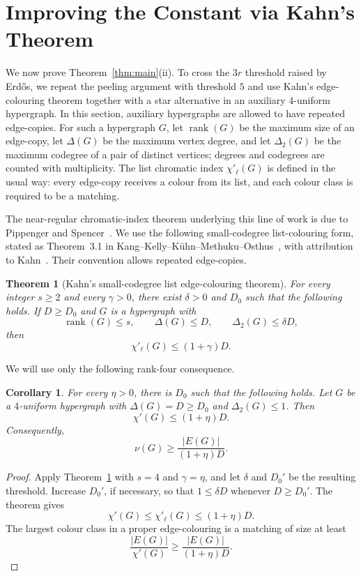 \documentclass[11pt]{amsart}
\newtheorem{theorem}{Theorem}
\newtheorem{corollary}{Corollary}
\theoremstyle{remark}
\newcommand{\rank}{\operatorname{rank}}
\newcommand{\gam}{\gamma}
\newcommand{\Del}{\Delta}
\newcommand{\DelTwo}{\Delta_2}
\begin{document}
\section{Improving the Constant via Kahn's Theorem}

We now prove Theorem~\ref{thm:main}(ii).  To cross the $3r$ threshold raised
by Erd\H{o}s, we repeat the peeling argument with threshold $5$ and use
Kahn's edge-colouring theorem together with a star alternative in an auxiliary
$4$-uniform hypergraph.  In this section, auxiliary
hypergraphs are allowed to have repeated edge-copies.  For such a hypergraph
$G$, let $\rank(G)$ be the maximum size of an edge-copy, let $\Del(G)$ be the
maximum vertex degree, and let $\DelTwo(G)$ be the maximum codegree of a pair
of distinct vertices; degrees and codegrees are counted with multiplicity.  The
list chromatic index $\chi'_\ell(G)$ is defined in the usual way: every
edge-copy receives a colour from its list, and each colour class is required
to be a matching.

The near-regular chromatic-index theorem underlying this line of work is due
to Pippenger and Spencer~\cite{PippengerSpencer}.  We use the following
small-codegree list-colouring form, stated as Theorem~3.1 in
Kang--Kelly--K\"uhn--Methuku--Osthus~\cite{KKMO}, with attribution to
Kahn~\cite{KahnList}.  Their convention allows repeated edge-copies.

\begin{theorem}[Kahn's small-codegree list edge-colouring theorem]
\label{thm:kahn}
For every integer $s\ge 2$ and every $\gam>0$, there exist $\delta>0$ and
$D_0$ such that the following holds.  If $D\ge D_0$ and $G$ is a hypergraph
with
\[
  \rank(G)\le s,\qquad \Del(G)\le D,\qquad \DelTwo(G)\le \delta D,
\]
then
\[
  \chi'_\ell(G)\le (1+\gam)D.
\]
\end{theorem}

We will use only the following rank-four consequence.

\begin{corollary}\label{cor:kahn-rank-four}
For every $\eta>0$, there is $D_0$ such that the following holds.  Let $G$ be
a $4$-uniform hypergraph with $\Del(G)=D\ge D_0$ and
$\DelTwo(G)\le 1$.  Then
\[
  \chi'(G)\le (1+\eta)D.
\]
Consequently,
\[
  \nu(G)\ge \frac{|E(G)|}{(1+\eta)D}.
\]
\end{corollary}

\begin{proof}
Apply Theorem~\ref{thm:kahn} with $s=4$ and $\gam=\eta$, and let $\delta$ and
$D_0'$ be the resulting threshold.  Increase $D_0'$, if necessary, so that
$1\le\delta D$ whenever $D\ge D_0'$.
The theorem gives
\[
  \chi'(G)\le \chi'_\ell(G)\le (1+\eta)D.
\]
The largest colour class in a proper edge-colouring is a matching of size at
least
\[
  \frac{|E(G)|}{\chi'(G)}
  \ge \frac{|E(G)|}{(1+\eta)D}.
\]
\end{proof}
\end{document}
